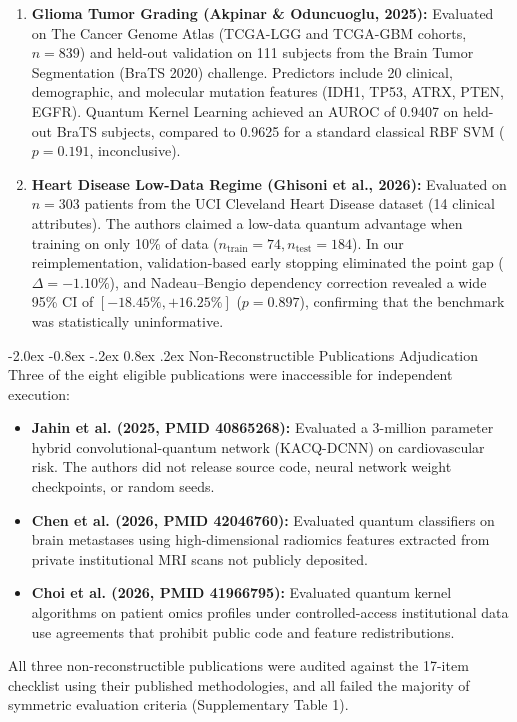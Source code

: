 \documentclass[10pt,a4paper]{article}
\makeatletter
\renewcommand{\subsection}{\@startsection{subsection}{2}{\z@}%
  {-2.0ex \@plus -0.8ex \@minus -.2ex}%
  {0.8ex \@plus.2ex}%
  {\normalfont\large\sffamily\bfseries\color{naturedark}}}
\makeatother
\begin{document}
\begin{enumerate}
  \item \textbf{Glioma Tumor Grading (Akpinar \& Oduncuoglu, 2025):} Evaluated on The Cancer Genome Atlas (TCGA-LGG and TCGA-GBM cohorts, $n = 839$) and held-out validation on 111 subjects from the Brain Tumor Segmentation (BraTS 2020) challenge. Predictors include 20 clinical, demographic, and molecular mutation features (IDH1, TP53, ATRX, PTEN, EGFR). Quantum Kernel Learning achieved an AUROC of 0.9407 on held-out BraTS subjects, compared to 0.9625 for a standard classical RBF SVM ($p = 0.191$, inconclusive).
  \item \textbf{Heart Disease Low-Data Regime (Ghisoni et al., 2026):} Evaluated on $n = 303$ patients from the UCI Cleveland Heart Disease dataset (14 clinical attributes). The authors claimed a low-data quantum advantage when training on only 10\% of data ($n_{\text{train}} = 74, n_{\text{test}} = 184$). In our reimplementation, validation-based early stopping eliminated the point gap ($\Delta = -1.10\%$), and Nadeau--Bengio dependency correction revealed a wide 95\% CI of $[-18.45\%, +16.25\%]$ ($p = 0.897$), confirming that the benchmark was statistically uninformative.
\end{enumerate}

\subsection{Non-Reconstructible Publications Adjudication}
Three of the eight eligible publications were inaccessible for independent execution:
\begin{itemize}
  \item \textbf{Jahin et al. (2025, PMID 40865268):} Evaluated a 3-million parameter hybrid convolutional-quantum network (KACQ-DCNN) on cardiovascular risk. The authors did not release source code, neural network weight checkpoints, or random seeds.
  \item \textbf{Chen et al. (2026, PMID 42046760):} Evaluated quantum classifiers on brain metastases using high-dimensional radiomics features extracted from private institutional MRI scans not publicly deposited.
  \item \textbf{Choi et al. (2026, PMID 41966795):} Evaluated quantum kernel algorithms on patient omics profiles under controlled-access institutional data use agreements that prohibit public code and feature redistributions.
\end{itemize}
All three non-reconstructible publications were audited against the 17-item checklist using their published methodologies, and all failed the majority of symmetric evaluation criteria (Supplementary Table 1).
\newpage
\end{document}
